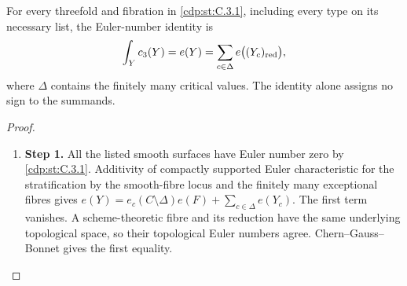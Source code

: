 \begin{proposition}\hypertarget{tag-01FB}{}\label{cdp:st:C.3.5}

For every threefold and fibration in \ref{cdp:st:C.3.1}, including every type on
its necessary list, the Euler-number identity is
\[
\int_Y c_3(Y)=e(Y)=\sum_{c\in\Delta}e\bigl((Y_c)_{\rm red}\bigr),
\]
where $\Delta$ contains the finitely many critical values.
The identity alone assigns no sign to the summands.
\end{proposition}


\begin{proof}
\begin{enumerate}[label={$\langle1\rangle$\arabic*.},leftmargin=*]
\item 
\noindent\textbf{Step 1.} All the listed smooth surfaces have Euler number zero by \ref{cdp:st:C.3.1}.
Additivity of compactly supported Euler characteristic for the
stratification by the smooth-fibre locus and the finitely many
exceptional fibres gives
$e(Y)=e_c(C\setminus\Delta)e(F)+\sum_{c\in\Delta}e(Y_c)$.
The first term vanishes. A scheme-theoretic fibre and its reduction
have the same underlying topological space, so their topological
Euler numbers agree. Chern--Gauss--Bonnet gives the first equality.

\end{enumerate}
\end{proof}